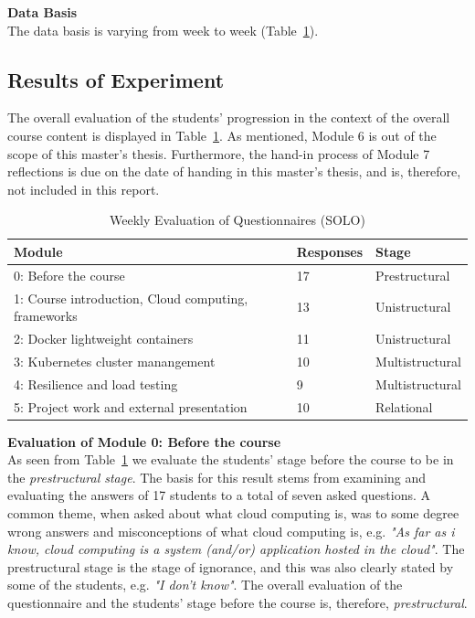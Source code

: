 \noindent\textbf{Data Basis} \\
The data basis is varying from week to week (Table~\ref{table:weeklyevaluation}).


\subsection*{Results of Experiment}
The overall evaluation of the students' progression in the context of the overall course content is displayed in Table~\ref{table:weeklyevaluation}. As mentioned, Module 6 is out of the scope of this master's thesis. Furthermore, the hand-in process of Module 7 reflections is due on the date of handing in this master's thesis, and is, therefore, not included in this report.

\begin{table}[H]
\centering

\begin{tabular}{|l|l|l|}
\hline
\rowcolor[HTML]{EFEFEF} 
\textbf{Module}                           & \textbf{Responses}          & \textbf{Stage} \\ \hline
0: Before the course                                 & 17   & Prestructural  \\ \hline
1: Course introduction, Cloud computing, frameworks & 13 & Unistructural  \\ \hline
2: Docker lightweight containers                   & 11 & Unistructural  \\ \hline
3: Kubernetes cluster manangement                 & 10  & Multistructural\\ \hline
4: Resilience and load testing                    & 9  & Multistructural            \\ \hline
5: Project work and external presentation        & 10   & Relational            \\ \hline
\end{tabular}
\caption{Weekly Evaluation of Questionnaires (SOLO)}
\label{table:weeklyevaluation}
\end{table}

\noindent\textbf{Evaluation of Module 0: Before the course} \\
As seen from Table~\ref{table:weeklyevaluation} we evaluate the students' stage before the course to be in the \textit{prestructural stage}. The basis for this result stems from examining and evaluating the answers of 17 students to a total of seven asked questions. A common theme, when asked about what cloud computing is, was to some degree wrong answers and misconceptions of what cloud computing is, e.g. \textit{"As far as i know, cloud computing is a system (and/or) application hosted in the cloud"}. The prestructural stage is the stage of ignorance, and this was also clearly stated by some of the students, e.g. \textit{"I don't know"}. The overall evaluation of the questionnaire and the students' stage before the course is, therefore, \textit{prestructural}. \\

